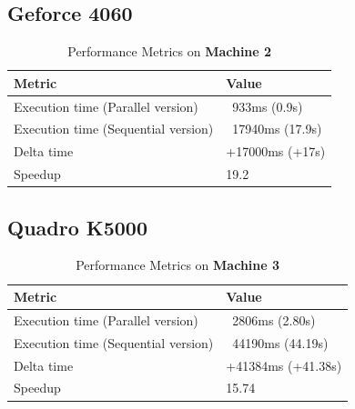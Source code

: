         
        \subsection{Geforce 4060}
        
        \begin{table}[H]
            \centering
            \begin{tabular}{|l|l|}
            \hline
            \textbf{Metric}                         & \textbf{Value}                       \\ \hline
            Execution time (Parallel version)       & ~933ms (0.9s)                        \\ \hline
            Execution time (Sequential version)     & ~17940ms (17.9s)                     \\ \hline
            Delta time                               & +17000ms (+17s)                      \\ \hline
            Speedup                                  & 19.2                                  \\ \hline
            \end{tabular}
            \caption{Performance Metrics on \textbf{Machine 2}}
            \label{table:performance_metrics_test5_machine2}
        \end{table}
        
        
        \subsection{Quadro K5000}
        
        \begin{table}[H]
            \centering
            \begin{tabular}{|l|l|}
            \hline
            \textbf{Metric}                         & \textbf{Value}                       \\ \hline
            Execution time (Parallel version)       & ~2806ms (2.80s)                      \\ \hline
            Execution time (Sequential version)     & ~44190ms (44.19s)                    \\ \hline
            Delta time                               & +41384ms (+41.38s)                   \\ \hline
            Speedup                                  & 15.74                                 \\ \hline
            \end{tabular}
            \caption{Performance Metrics on \textbf{Machine 3}}
            \label{table:performance_metrics_test5_machine3}
        \end{table}
